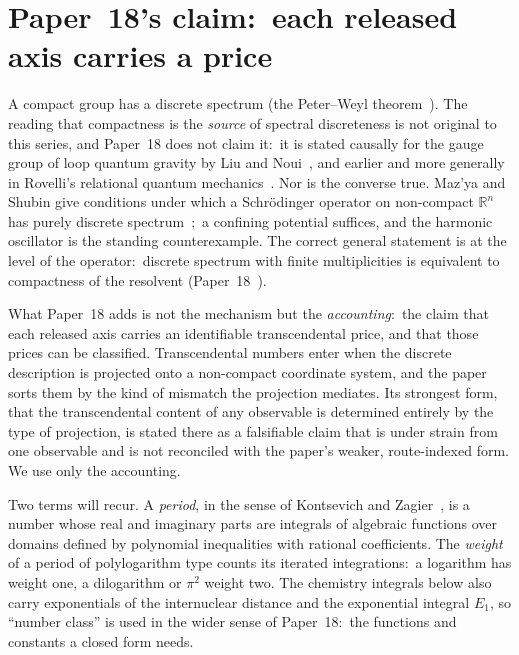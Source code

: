 \documentclass[aps,pra,twocolumn,superscriptaddress,longbibliography]{revtex4-2}
\begin{document}
\section{Paper~18's claim:\ each released axis carries a price}
\label{sec:rule}

A compact group has a discrete spectrum (the Peter--Weyl
theorem~\cite{peter_weyl1927}).  The reading that compactness is the
\emph{source} of spectral discreteness is not original to this series,
and Paper~18 does not claim it:\ it is stated causally for the gauge
group of loop quantum gravity by Liu and Noui~\cite{liu_noui2017}, and earlier and more generally in Rovelli's relational quantum
mechanics~\cite{rovelli1996}.  Nor is the converse true.  Maz'ya
and Shubin give conditions under which a Schr\"odinger operator on
non-compact $\mathbb{R}^n$ has purely discrete
spectrum~\cite{mazya_shubin2005};\ a confining potential suffices, and
the harmonic oscillator is the standing counterexample.  The correct
general statement is at the level of the operator:\ discrete spectrum
with finite multiplicities is equivalent to compactness of the resolvent
(Paper~18~\cite{loutey_paper18}).

What Paper~18 adds is not the mechanism but the \emph{accounting}:\ the
claim that each released axis carries an identifiable transcendental
price, and that those prices can be classified.  Transcendental numbers
enter when the discrete description is projected onto a non-compact
coordinate system, and the paper sorts them by the kind of mismatch the
projection mediates.  Its strongest form, that the transcendental content
of any observable is determined entirely by the type of projection, is
stated there as a falsifiable claim that is under strain from one
observable and is not reconciled with the paper's weaker, route-indexed
form.  We use only the accounting.

Two terms will recur.  A \emph{period}, in the sense of Kontsevich and
Zagier~\cite{kontsevich_zagier2001}, is a number whose real and imaginary
parts are integrals of algebraic functions over domains defined by
polynomial inequalities with rational coefficients.  The \emph{weight} of
a period of polylogarithm type counts its iterated integrations:\ a
logarithm has weight one, a dilogarithm or $\pi^2$ weight two.  The
chemistry integrals below also carry exponentials of the internuclear
distance and the exponential integral $E_1$, so ``number class'' is used
in the wider sense of Paper~18:\ the functions and constants a closed
form needs.
\end{document}
